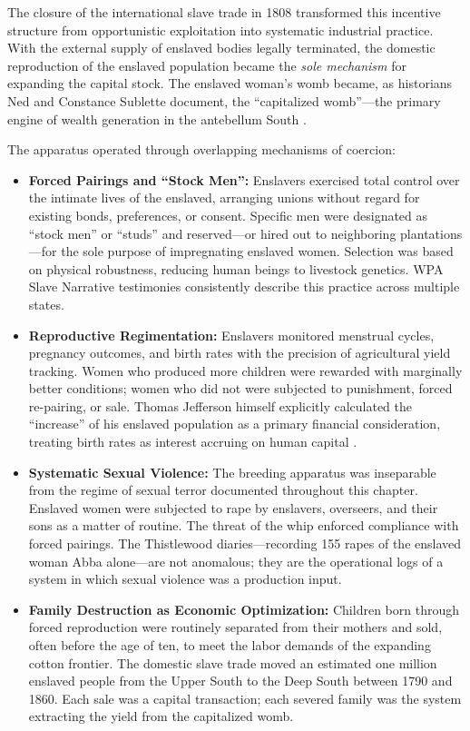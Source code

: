 \documentclass[12pt,openany]{book}
\begin{document}
The closure of the international slave trade in 1808 transformed this incentive structure from opportunistic exploitation into systematic industrial practice. With the external supply of enslaved bodies legally terminated, the domestic reproduction of the enslaved population became the \textit{sole mechanism} for expanding the capital stock. The enslaved woman's womb became, as historians Ned and Constance Sublette document, the ``capitalized womb''---the primary engine of wealth generation in the antebellum South \cite{sublette}.

The apparatus operated through overlapping mechanisms of coercion:

\begin{itemize}
    \item \textbf{Forced Pairings and ``Stock Men'':} Enslavers exercised total control over the intimate lives of the enslaved, arranging unions without regard for existing bonds, preferences, or consent. Specific men were designated as ``stock men'' or ``studs'' and reserved---or hired out to neighboring plantations---for the sole purpose of impregnating enslaved women. Selection was based on physical robustness, reducing human beings to livestock genetics. WPA Slave Narrative testimonies consistently describe this practice across multiple states.

    \item \textbf{Reproductive Regimentation:} Enslavers monitored menstrual cycles, pregnancy outcomes, and birth rates with the precision of agricultural yield tracking. Women who produced more children were rewarded with marginally better conditions; women who did not were subjected to punishment, forced re-pairing, or sale. Thomas Jefferson himself explicitly calculated the ``increase'' of his enslaved population as a primary financial consideration, treating birth rates as interest accruing on human capital \cite{baptist}.

    \item \textbf{Systematic Sexual Violence:} The breeding apparatus was inseparable from the regime of sexual terror documented throughout this chapter. Enslaved women were subjected to rape by enslavers, overseers, and their sons as a matter of routine. The threat of the whip enforced compliance with forced pairings. The Thistlewood diaries---recording 155 rapes of the enslaved woman Abba alone---are not anomalous; they are the operational logs of a system in which sexual violence was a production input.

    \item \textbf{Family Destruction as Economic Optimization:} Children born through forced reproduction were routinely separated from their mothers and sold, often before the age of ten, to meet the labor demands of the expanding cotton frontier. The domestic slave trade moved an estimated one million enslaved people from the Upper South to the Deep South between 1790 and 1860. Each sale was a capital transaction; each severed family was the system extracting the yield from the capitalized womb.
\end{itemize}
\end{document}
